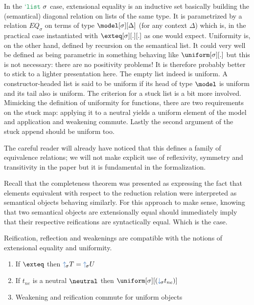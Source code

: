 \begin{definition}
In the $\tylist$ case, extensional equality is an inductive set basically building
the (semantical) diagonal relation on lists of the same type. It is parametrized
by a relation $EQ_\sigma$ on terms of type $\model[\sigma][\Delta]$ (for any context
$\Delta$) which is, in the practical case instantiated with $\exteq[\sigma][.][.]$
as one would expect. Uniformity is, on the other hand, defined by recursion on the
semantical list. It could very well be defined as being parametric in something
behaving like $\uniform[\sigma][.]$ but this is not necessary: there are no positivity
problems! It is therefore probably better to stick to a lighter presentation here.
The empty list indeed is uniform. A constructor-headed list is said to be uniform
if its head of type $\model$ is uniform and its tail also is uniform. The criterion
for a stuck list is a bit more involved. Mimicking the definition of uniformity for
functions, there are two requirements on the stuck map: applying it to a neutral
yields a uniform element of the model and application and weakening commute.
Lastly the second argument of the stuck append should be uniform too.
\end{definition}

\begin{remark}The careful reader will already have noticed that this defines a
family of equivalence relations; we will not make explicit use of reflexivity,
symmetry and transitivity in the paper but it is fundamental in the formalization.
\end{remark}

Recall that the completeness theorem was presented as expressing the fact that
elements equivalent with respect to the reduction relation were interpreted as
semantical objects behaving similarly. For this approach to make sense, knowing
that two semantical objects are extensionally equal should immediately imply
that their respective reifications are syntactically equal. Which is the case.

\begin{lemma}Reification, reflection and weakenings are compatible with the
notions of extensional equality and uniformity.
\begin{enumerate}
  \item If $\exteq$ then $\reify T = \reify U$
  \item If $t_{ne}$ is a neutral $\neutral$ then $\uniform[\sigma][(\reflect t_{ne})]$
  \item Weakening and reification commute for uniform objects
\end{enumerate}
\end{lemma}

